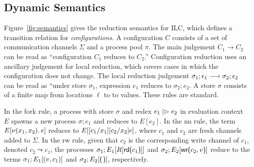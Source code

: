 \subsection{Dynamic Semantics}
\label{subsec:semantics}



Figure~\ref{fig:semantics} gives the reduction semantics for ILC, which defines
a transition relation for \emph{configurations}. A configuration $C$ consists of
a set of communication channels $\Sigma$ and a process pool $\pi$. The main judgement
$C_1 \longrightarrow C_2$ can be read as ``configuration $C_1$ reduces to $C_2$.''
Configuration reduction uses an ancillary judgement for local reduction, which
covers cases in which the configuration does not change. The local reduction
judgement $\sigma_1; \epsilon_1 \longrightarrow \sigma_2; \epsilon_2$ can be read as ``under store $\sigma_1$,
expression $e_1$ reduces to $\sigma_{2}; e_2$. A store $\sigma$ consists of a finite map
from locations $\ell$ to to values. These rules are standard.

In the fork rule, a process with store $\sigma$ and redex $e_1 \mathrel{|\rhd} e_2$ in
evaluation context $E$ spawns a new process $\sigma; e_1$ and reduces to $E[e_2]$. In
the nu rule, the term $E[ \nu(x_1, x_2).\,e ]$ reduces to $E[
  [c_1/x_1][c_2/x_2]e ]$, where $c_1$ and $c_2$ are fresh
channels added to $\Sigma$. In the rw rule, given that $c_2$ is the corresponding
write channel of $c_1$, denoted $c_2 \leadsto c_1$, the processes $\sigma_1 ; E_1[R[
    \text{\textsf{rd}}\textsf{(}{c_1}\textsf{)}] ]$ and $\sigma_2 ; E_2[ \text{\textsf{wr}}\textsf{(}{c_2},{v}\textsf{)}]$ reduce to the
terms $\sigma_1 ; E_1[ (v, c_1)]$ and $\sigma_2 ; E_2[ \eUnit]$, respectively.

\begin{comment}






\end{comment}


